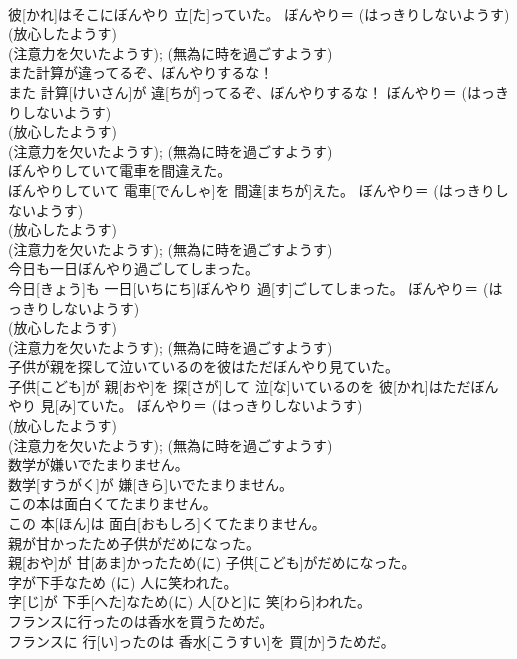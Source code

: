 \documentclass[8pt]{extreport}
\begin{document}
\begin{CJK}{UTF8}{min}
\\	彼[かれ]はそこにぼんやり 立[た]っていた。	ぼんやり＝ (はっきりしないようす) 
\\	(放心したようす) 
\\	(注意力を欠いたようす); (無為に時を過ごすようす) 
\\	また計算が違ってるぞ、ぼんやりするな！	
\\	また 計算[けいさん]が 違[ちが]ってるぞ、ぼんやりするな！	ぼんやり＝ (はっきりしないようす) 
\\	(放心したようす) 
\\	(注意力を欠いたようす); (無為に時を過ごすようす) 
\\	ぼんやりしていて電車を間違えた。	
\\	ぼんやりしていて 電車[でんしゃ]を 間違[まちが]えた。	ぼんやり＝ (はっきりしないようす) 
\\	(放心したようす) 
\\	(注意力を欠いたようす); (無為に時を過ごすようす) 
\\	今日も一日ぼんやり過ごしてしまった。	
\\	今日[きょう]も 一日[いちにち]ぼんやり 過[す]ごしてしまった。	ぼんやり＝ (はっきりしないようす) 
\\	(放心したようす) 
\\	(注意力を欠いたようす); (無為に時を過ごすようす) 
\\	子供が親を探して泣いているのを彼はただぼんやり見ていた。	
\\	子供[こども]が 親[おや]を 探[さが]して 泣[な]いているのを 彼[かれ]はただぼんやり 見[み]ていた。	ぼんやり＝ (はっきりしないようす) 
\\	(放心したようす) 
\\	(注意力を欠いたようす); (無為に時を過ごすようす) 
\\	数学が嫌いでたまりません。	
\\	数学[すうがく]が 嫌[きら]いでたまりません。	
\\	この本は面白くてたまりません。	
\\	この 本[ほん]は 面白[おもしろ]くてたまりません。	
\\	親が甘かったため子供がだめになった。	
\\	親[おや]が 甘[あま]かったため(に) 子供[こども]がだめになった。	
\\	字が下手なため (に) 人に笑われた。	
\\	字[じ]が 下手[へた]なため(に) 人[ひと]に 笑[わら]われた。	
\\	フランスに行ったのは香水を買うためだ。	
\\	フランスに 行[い]ったのは 香水[こうすい]を 買[か]うためだ。	

\end{CJK}
\end{document}
